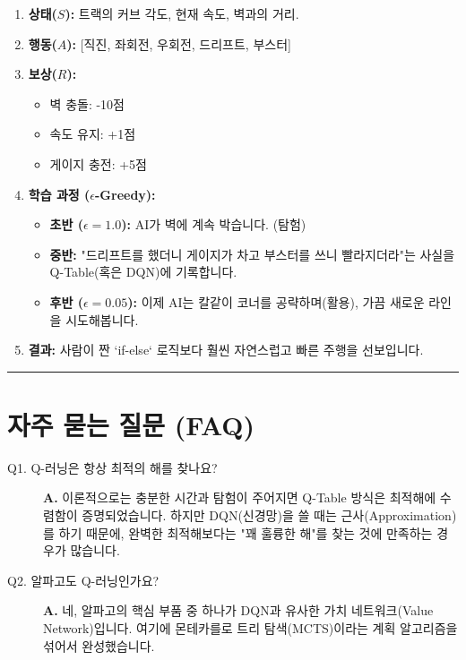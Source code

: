 \documentclass[11pt,a4paper]{book}
\theoremstyle{definition}
\begin{document}
\begin{enumerate}
    \item \textbf{상태($S$):} 트랙의 커브 각도, 현재 속도, 벽과의 거리.
    \item \textbf{행동($A$):} [직진, 좌회전, 우회전, 드리프트, 부스터]
    \item \textbf{보상($R$):}
    \begin{itemize}
        \item 벽 충돌: -10점
        \item 속도 유지: +1점
        \item 게이지 충전: +5점
    \end{itemize}
    \item \textbf{학습 과정 ($\epsilon$-Greedy):}
    \begin{itemize}
        \item \textbf{초반 ($\epsilon=1.0$):} AI가 벽에 계속 박습니다. (탐험)
        \item \textbf{중반:} "드리프트를 했더니 게이지가 차고 부스터를 쓰니 빨라지더라"는 사실을 Q-Table(혹은 DQN)에 기록합니다.
        \item \textbf{후반 ($\epsilon=0.05$):} 이제 AI는 칼같이 코너를 공략하며(활용), 가끔 새로운 라인을 시도해봅니다.
    \end{itemize}
    \item \textbf{결과:} 사람이 짠 `if-else` 로직보다 훨씬 자연스럽고 빠른 주행을 선보입니다.
\end{enumerate}

\vspace{0.5cm}\hrule\vspace{0.5cm}

\section{자주 묻는 질문 (FAQ)}

\begin{description}
    \item[Q1. Q-러닝은 항상 최적의 해를 찾나요?]
    \textbf{A.} 이론적으로는 충분한 시간과 탐험이 주어지면 Q-Table 방식은 최적해에 수렴함이 증명되었습니다. 하지만 DQN(신경망)을 쓸 때는 근사(Approximation)를 하기 때문에, 완벽한 최적해보다는 "꽤 훌륭한 해"를 찾는 것에 만족하는 경우가 많습니다.
    
    \item[Q2. 알파고도 Q-러닝인가요?]
    \textbf{A.} 네, 알파고의 핵심 부품 중 하나가 DQN과 유사한 가치 네트워크(Value Network)입니다. 여기에 몬테카를로 트리 탐색(MCTS)이라는 계획 알고리즘을 섞어서 완성했습니다.
\end{description}
\end{document}
